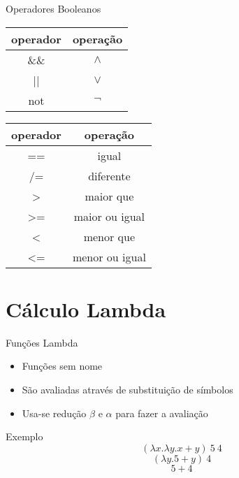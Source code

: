 \documentclass{beamer}
\begin{document}
	\begin{frame}{Operadores Booleanos}
	 
	 \begin{table}[h]
	  \begin{tabular}{c | c}
	  \hline
	   operador & operação\\
	   \hline
	   \&\& & $\land$ \\
	   || & $\lor$ \\
	   not & $\lnot$ \\
	   \hline
	  \end{tabular}
	 \end{table}
	 
	 \begin{table}[h]
	  \begin{tabular}{c | c}
	  \hline
	   operador & operação\\
	   \hline
	   == & igual \\
	   /= & diferente \\
	   > & maior que \\
	   >= & maior ou igual \\
	   < & menor que \\
	   <= & menor ou igual \\
	  \end{tabular}
	 \end{table} 
	\end{frame}
	
	\section{Cálculo Lambda}
	
		\begin{frame}{}
		\end{frame}

		\begin{frame}{Funções Lambda}
		 
		 \begin{itemize}
		  \item Funções sem nome
		  \item São avaliadas através de substituição de símbolos
		  \item Usa-se redução $\beta$ e $\alpha$ para fazer a avaliação
		 \end{itemize}
		 
		 \begin{block}{Exemplo}
		  \[(\lambda x. \lambda y. x+y)~ 5~ 4\]
		  \[(\lambda y. 5+y)~ 4\]
		  \[5+4\]		  
		 \end{block}		 
		\end{frame}
		
\end{document}
